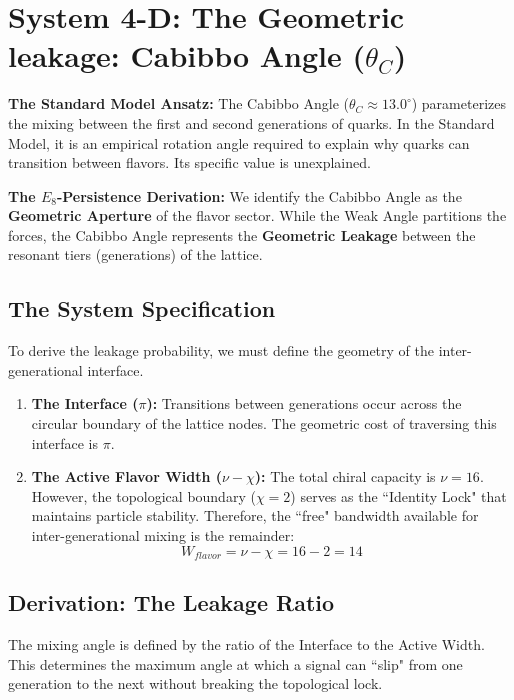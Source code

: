 \section{System 4-D: The Geometric leakage: Cabibbo Angle (\texorpdfstring{$\theta_C$}{thetaC})}


\textbf{The Standard Model Ansatz:} The Cabibbo Angle ($\theta_C \approx 13.0^\circ$) parameterizes the mixing between the first and second generations of quarks. In the Standard Model, it is an empirical rotation angle required to explain why quarks can transition between flavors. Its specific value is unexplained.

\textbf{The $E_8$-Persistence Derivation:} We identify the Cabibbo Angle as the \textbf{Geometric Aperture} of the flavor sector. While the Weak Angle partitions the forces, the Cabibbo Angle represents the \textbf{Geometric Leakage} between the resonant tiers (generations) of the lattice.

\subsection{The System Specification}
To derive the leakage probability, we must define the geometry of the inter-generational interface.

\begin{enumerate}
    \item \textbf{The Interface ($\pi$):} Transitions between generations occur across the circular boundary of the lattice nodes. The geometric cost of traversing this interface is $\pi$.
    
    \item \textbf{The Active Flavor Width ($\nu - \chi$):} The total chiral capacity is $\nu=16$. However, the topological boundary ($\chi=2$) serves as the ``Identity Lock" that maintains particle stability. Therefore, the ``free" bandwidth available for inter-generational mixing is the remainder:
    $$ W_{flavor} = \nu - \chi = 16 - 2 = 14 $$
\end{enumerate}

\subsection{Derivation: The Leakage Ratio}
The mixing angle is defined by the ratio of the Interface to the Active Width. This determines the maximum angle at which a signal can ``slip" from one generation to the next without breaking the topological lock.

